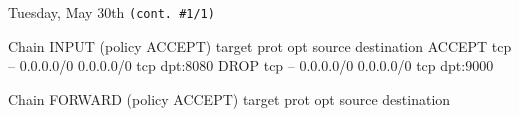 \documentclass[11pt]{article}
\begin{document}
\newpage

\begin{bloodorangebox}{Tuesday, May 30th \hspace{0.2cm}\texttt{(cont. \#1/1)}\vspace{-2.2em}\begin{flushright}\large{}\end{flushright}}
    \begin{ubuntu}
Chain INPUT (policy ACCEPT)
target     prot opt source               destination         
ACCEPT     tcp  --  0.0.0.0/0            0.0.0.0/0            tcp dpt:8080
DROP       tcp  --  0.0.0.0/0            0.0.0.0/0            tcp dpt:9000

Chain FORWARD (policy ACCEPT)
target     prot opt source               destination         


\end{ubuntu}
\end{bloodorangebox}
\end{document}

